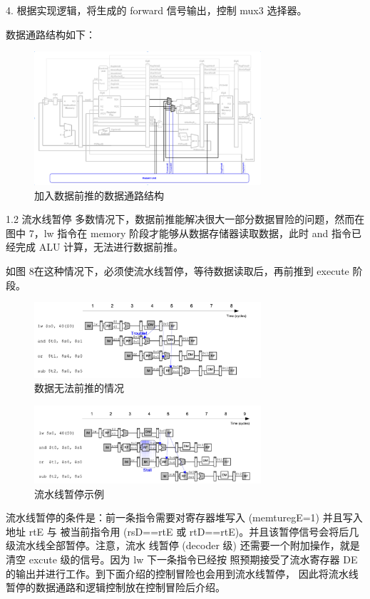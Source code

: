 4. 根据实现逻辑，将生成的 forward 信号输出，控制 mux3 选择器。

数据通路结构如下：
\begin{figure}[H]
	\centering
	\includegraphics[width=0.75\textwidth]{figure/加入数据前推的数据通路结构.png}
	\caption{加入数据前推的数据通路结构}
	\label{fig:data_forward_data_path}
\end{figure}

1.2 流水线暂停
多数情况下，数据前推能解决很大一部分数据冒险的问题，然而在图中 7，lw 指令在 memory
阶段才能够从数据存储器读取数据，此时 and 指令已经完成 ALU 计算，无法进行数据前推。

如图 8在这种情况下，必须使流水线暂停，等待数据读取后，再前推到 execute 阶段。
\begin{figure}[H]
	\centering
	\includegraphics[width=0.75\textwidth]{figure/数据无法前推的情况.png}
	\caption{数据无法前推的情况}
	\label{fig:data_forward_stall}
\end{figure}

\begin{figure}[H]
	\centering
	\includegraphics[width=0.75\textwidth]{figure/流水线暂停示例.png}
	\caption{流水线暂停示例}
	\label{fig:data_forward_stall_example}
\end{figure}
流水线暂停的条件是：前一条指令需要对寄存器堆写入 (memturegE=1) 并且写入地址 rtE 与
被当前指令用 (rsD==rtE 或 rtD==rtE)。并且该暂停信号会将后几级流水线全部暂停。注意，流水
线暂停 (decoder 级) 还需要一个附加操作，就是清空 excute 级的信号。因为 lw 下一条指令已经按
照预期接受了流水寄存器 DE 的输出并进行工作。到下面介绍的控制冒险也会用到流水线暂停，
因此将流水线暂停的数据通路和逻辑控制放在控制冒险后介绍。

